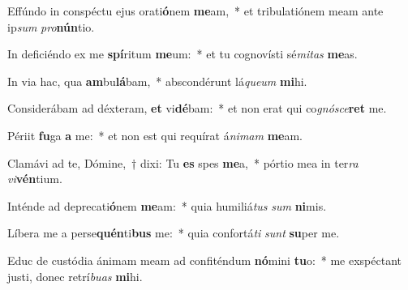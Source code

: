 \item Effúndo in conspéctu ejus orati\textbf{ó}nem \textbf{me}am,~* et tribulatiónem meam ante ip\textit{sum} \textit{pro}\textbf{nún}tio.
\item In deficiéndo ex me \textbf{spí}ritum \textbf{me}um:~* et tu cognovísti sé\textit{mi}\textit{tas} \textbf{me}as.
\item In via hac, qua \textbf{am}bu\textbf{lá}bam,~* abscondérunt lá\textit{que}\textit{um} \textbf{mi}hi.
\item Considerábam ad déxteram, \textbf{et} vi\textbf{dé}bam:~* et non erat qui co\textit{gnó}\textit{sce}\textbf{ret} me.
\item Périit \textbf{fu}ga \textbf{a} me:~* et non est qui requírat á\textit{ni}\textit{mam} \textbf{me}am.
\item Clamávi ad te, Dómine,~† dixi: Tu \textbf{es} spes \textbf{me}a,~* pórtio mea in ter\textit{ra} \textit{vi}\textbf{vén}tium.
\item Inténde ad deprecati\textbf{ó}nem \textbf{me}am:~* quia humiliá\textit{tus} \textit{sum} \textbf{ni}mis.
\item Líbera me a perse\textbf{quén}ti\textbf{bus} me:~* quia confortá\textit{ti} \textit{sunt} \textbf{su}per me.
\item Educ de custódia ánimam meam ad confiténdum \textbf{nó}mini \textbf{tu}o:~* me exspéctant justi, donec retrí\textit{bu}\textit{as} \textbf{mi}hi.
